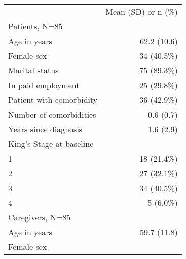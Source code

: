\begin{table}[!h]
\centering
\begin{tabular}{ll}
\cline{1-2}
\multicolumn{1}{r}{} &
  \multicolumn{1}{c}{Mean (SD) or n (\%)} \\
\cline{1-2}
\multicolumn{1}{l}{Patients, N=85} &
  \multicolumn{1}{r}{} \\
\multicolumn{1}{l}{\hspace{1em}Age in years} &
  \multicolumn{1}{r}{62.2 (10.6)} \\
\multicolumn{1}{l}{\hspace{1em}Female sex} &
  \multicolumn{1}{r}{34 (40.5\%)} \\
\multicolumn{1}{l}{\hspace{1em}Marital status} &
  \multicolumn{1}{r}{75 (89.3\%)} \\
\multicolumn{1}{l}{\hspace{1em}In paid employment} &
  \multicolumn{1}{r}{25 (29.8\%)} \\
\multicolumn{1}{l}{\hspace{1em}Patient with comorbidity} &
  \multicolumn{1}{r}{36 (42.9\%)} \\
\multicolumn{1}{l}{\hspace{1em}Number of comorbidities} &
  \multicolumn{1}{r}{0.6 (0.7)} \\
\multicolumn{1}{l}{\hspace{1em}Years since diagnosis} &
  \multicolumn{1}{r}{1.6 (2.9)} \\
\multicolumn{1}{l}{\hspace{1em}King's Stage at baseline} &
  \multicolumn{1}{r}{} \\
\multicolumn{1}{l}{\hspace{2em}1} &
  \multicolumn{1}{r}{18 (21.4\%)} \\
\multicolumn{1}{l}{\hspace{2em}2} &
  \multicolumn{1}{r}{27 (32.1\%)} \\
\multicolumn{1}{l}{\hspace{2em}3} &
  \multicolumn{1}{r}{34 (40.5\%)} \\
\multicolumn{1}{l}{\hspace{2em}4} &
  \multicolumn{1}{r}{5 (6.0\%)} \\
\multicolumn{1}{l}{Caregivers, N=85} &
  \multicolumn{1}{r}{} \\
\multicolumn{1}{l}{\hspace{1em}Age in years} &
  \multicolumn{1}{r}{59.7 (11.8)} \\
\multicolumn{1}{l}{\hspace{1em}Female sex} &

\end{tabular}
\end{table}
